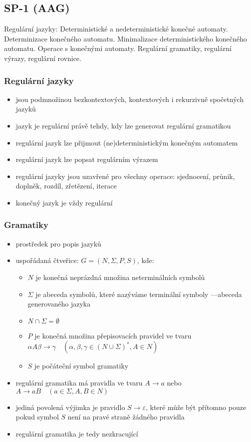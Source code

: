 \subsection{SP-1 (AAG)}
Regulární jazyky: Deterministické a nedeterministické konečné automaty. Determinizace konečného automatu. Minimalizace deterministického konečného automatu. Operace s konečnými automaty. Regulární gramatiky, regulární výrazy, regulární rovnice.

\subsubsection*{Regulární jazyky}
\begin{itemize}
	\item jsou podmnožinou bezkontextových, kontextových i rekurzivně spočetných jazyků
	\item jazyk je regulární právě tehdy, kdy lze generovat regulární gramatikou
	\item regulární jazyk lze přijmout (ne)deterministickým konečným automatem
	\item regulární jazyk lze popsat regulárním výrazem
	\item regulární jazyky jsou uzavřené pro všechny operace: sjednocení, průnik, doplněk, rozdíl, zřetězení, iterace
	\item konečný jazyk je vždy regulární
\end{itemize}

\subsubsection*{Gramatiky}
\begin{itemize}
	\item prostředek pro popis jazyků
	\item uspořádaná čtveřice: $G = (N, \Sigma, P, S)$, kde:
	\begin{itemize}
		\item $N$ je konečná neprázdná množina neterminálních symbolů
		\item $\Sigma$ je abeceda symbolů, které nazýváme terminální symboly ---abeceda generovaného jazyka
		\item $N \cap \Sigma = \emptyset$
		\item $P$ je konečná množina přepisovacích pravidel ve tvaru $\alpha A \beta \rightarrow \gamma \quad (\alpha, \beta	, \gamma \in (N \cup \Sigma)^*, A \in N)$
		\item $S$ je počáteční symbol gramatiky
	\end{itemize}
	\item regulární gramatika má pravidla ve tvaru $A \rightarrow a$ nebo $A \rightarrow aB \quad (a \in \Sigma, A,B \in N)$
	\item jediná povolená výjimka je pravidlo $S \rightarrow \varepsilon$, které může být přítomno pouze pokud symbol $S$ není na pravé straně žádného pravidla
	\item regulární gramatika je tedy nezkracující
\end{itemize}

